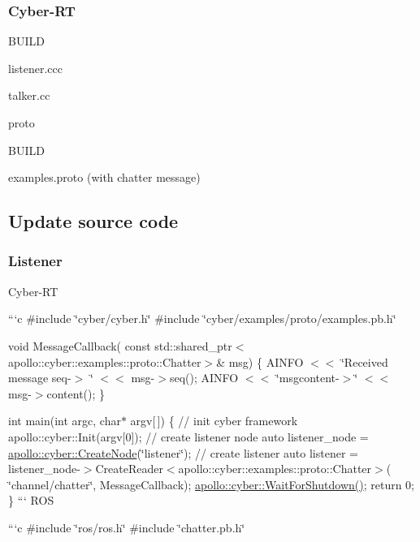 \subsubsection*{Cyber-\/\-R\-T}


\begin{DoxyItemize}
\item B\-U\-I\-L\-D
\item listener.\-ccc
\item talker.\-cc
\item proto
\begin{DoxyItemize}
\item B\-U\-I\-L\-D
\item examples.\-proto (with chatter message)
\end{DoxyItemize}
\end{DoxyItemize}

\subsection*{Update source code}

\subsubsection*{Listener}

Cyber-\/\-R\-T

```c \#include \char`\"{}cyber/cyber.\-h\char`\"{} \#include \char`\"{}cyber/examples/proto/examples.\-pb.\-h\char`\"{}

void Message\-Callback( const std\-::shared\-\_\-ptr$<$apollo\-::cyber\-::examples\-::proto\-::\-Chatter$>$\& msg) \{ A\-I\-N\-F\-O $<$$<$ \char`\"{}\-Received message seq-\/$>$ \char`\"{} $<$$<$ msg-\/$>$seq(); A\-I\-N\-F\-O $<$$<$ \char`\"{}msgcontent-\/$>$\char`\"{} $<$$<$ msg-\/$>$content(); \}

int main(int argc, char$\ast$ argv\mbox{[}$\,$\mbox{]}) \{ // init cyber framework apollo\-::cyber\-::\-Init(argv\mbox{[}0\mbox{]}); // create listener node auto listener\-\_\-node = \hyperlink{namespaceapollo_1_1cyber_ae369c5de0279f2a5745d0438d532bc89}{apollo\-::cyber\-::\-Create\-Node}(\char`\"{}listener\char`\"{}); // create listener auto listener = listener\-\_\-node-\/$>$Create\-Reader$<$apollo\-::cyber\-::examples\-::proto\-::\-Chatter$>$( \char`\"{}channel/chatter\char`\"{}, Message\-Callback); \hyperlink{namespaceapollo_1_1cyber_a7929114e78a9c595b0ee715968ca2712}{apollo\-::cyber\-::\-Wait\-For\-Shutdown()}; return 0; \} ``` R\-O\-S

```c \#include \char`\"{}ros/ros.\-h\char`\"{} \#include \char`\"{}chatter.\-pb.\-h\char`\"{}

